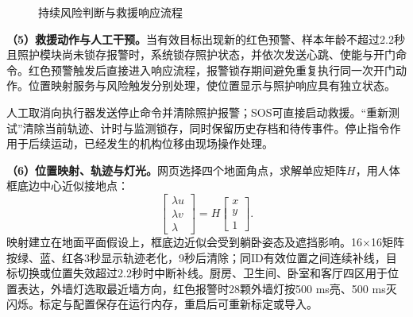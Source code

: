 \documentclass[UTF8,a4paper,zihao=-4,fontset=none,scheme=plain]{ctexart}
\begin{document}
\begin{figure}[H]
 \centering
 \caption{持续风险判断与救援响应流程}\label{fig:alarm}
\end{figure}

\textbf{（5）救援动作与人工干预。}当有效目标出现新的红色预警、样本年龄不超过2.2秒且照护模块尚未锁存报警时，系统锁存照护状态，并依次发送心跳、使能与开门命令。红色预警触发后直接进入响应流程，报警锁存期间避免重复执行同一次开门动作。位置映射服务与风险触发分别处理，使位置显示与照护响应具有独立状态。

人工取消向执行器发送停止命令并清除照护报警；SOS可直接启动救援。“重新测试”清除当前轨迹、计时与监测锁存，同时保留历史存档和待传事件。停止指令作用于后续运动，已经发生的机构位移由现场操作处理。

\textbf{（6）位置映射、轨迹与灯光。}网页选择四个地面角点，求解单应矩阵$H$，用人体框底边中心近似接地点：
\begin{equation}
 \begin{bmatrix}\lambda u\\\lambda v\\\lambda\end{bmatrix}
 =H\begin{bmatrix}x\\y\\1\end{bmatrix}.
 \label{eq:homography}
\end{equation}
映射建立在地面平面假设上，框底边近似会受到躺卧姿态及遮挡影响。16×16矩阵按绿、蓝、红各3秒显示轨迹老化，9秒后清除；同ID有效位置之间连续补线，目标切换或位置失效超过2.2秒时中断补线。厨房、卫生间、卧室和客厅四区用于位置表达，外墙灯选取最近墙方向，红色报警时28颗外墙灯按500 ms亮、500 ms灭闪烁。标定与配置保存在运行内存，重启后可重新标定或导入。
\end{document}
